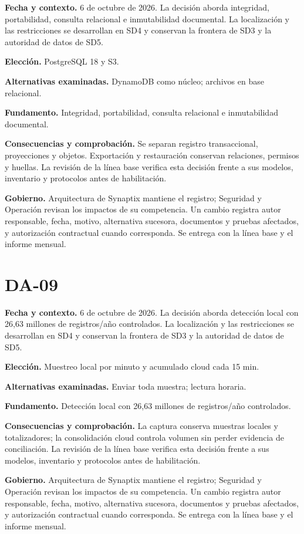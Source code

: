 \documentclass[11pt,letterpaper]{report}
\begin{document}
\textbf{Fecha y contexto.} 6 de octubre de 2026. La decisión aborda integridad, portabilidad, consulta relacional e inmutabilidad documental. La localización y las restricciones se desarrollan en SD4 y conservan la frontera de SD3 y la autoridad de datos de SD5.

\textbf{Elección.} PostgreSQL 18 y S3.

\textbf{Alternativas examinadas.} DynamoDB como núcleo; archivos en base relacional.

\textbf{Fundamento.} Integridad, portabilidad, consulta relacional e inmutabilidad documental.

\textbf{Consecuencias y comprobación.} Se separan registro transaccional, proyecciones y objetos. Exportación y restauración conservan relaciones, permisos y huellas. La revisión de la línea base verifica esta decisión frente a sus modelos, inventario y protocolos antes de habilitación.

\textbf{Gobierno.} Arquitectura de Synaptix mantiene el registro; Seguridad y Operación revisan los impactos de su competencia. Un cambio registra autor responsable, fecha, motivo, alternativa sucesora, documentos y pruebas afectados, y autorización contractual cuando corresponda. Se entrega con la línea base y el informe mensual.

\section*{DA-09}

\textbf{Fecha y contexto.} 6 de octubre de 2026. La decisión aborda detección local con 26,63 millones de registros/año controlados. La localización y las restricciones se desarrollan en SD4 y conservan la frontera de SD3 y la autoridad de datos de SD5.

\textbf{Elección.} Muestreo local por minuto y acumulado cloud cada 15 min.

\textbf{Alternativas examinadas.} Enviar toda muestra; lectura horaria.

\textbf{Fundamento.} Detección local con 26,63 millones de registros/año controlados.

\textbf{Consecuencias y comprobación.} La captura conserva muestras locales y totalizadores; la consolidación cloud controla volumen sin perder evidencia de conciliación. La revisión de la línea base verifica esta decisión frente a sus modelos, inventario y protocolos antes de habilitación.

\textbf{Gobierno.} Arquitectura de Synaptix mantiene el registro; Seguridad y Operación revisan los impactos de su competencia. Un cambio registra autor responsable, fecha, motivo, alternativa sucesora, documentos y pruebas afectados, y autorización contractual cuando corresponda. Se entrega con la línea base y el informe mensual.
\end{document}
